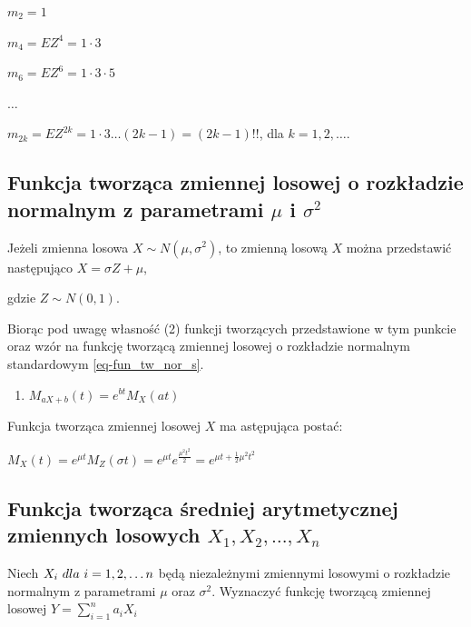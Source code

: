 \documentclass[
  letterpaper,
  DIV=11,
  numbers=noendperiod]{scrreprt}
\providecommand{\tightlist}{%
  \setlength{\itemsep}{0pt}\setlength{\parskip}{0pt}}\usepackage{longtable,booktabs,array}
\begin{document}
\(m_2 = 1\)

\(m_4 = EZ^4=1\cdot 3\)

\(m_6 = EZ^6=1\cdot 3 \cdot 5\)

\(\ldots\)

\(m_{2k} = EZ^{2k}=1\cdot 3 \ldots (2k-1)=(2k-1)!!\), dla
\(k = 1, 2, \ldots\).

\subsection{\texorpdfstring{Funkcja tworząca zmiennej losowej o
rozkładzie normalnym z parametrami \(\mu\) i
\(\sigma^2\)}{Funkcja tworząca zmiennej losowej o rozkładzie normalnym z parametrami \textbackslash mu i \textbackslash sigma\^{}2}}\label{funkcja-tworzux105ca-zmiennej-losowej-o-rozkux142adzie-normalnym-z-parametrami-mu-i-sigma2}

Jeżeli zmienna losowa \(X \sim N(\mu,\sigma^2)\), to zmienną losową
\(X\) można przedstawić następująco \(X = \sigma Z + \mu\),

gdzie \(Z \sim N(0,1)\).

Biorąc pod uwagę własność (2) funkcji tworzących przedstawione w tym
punkcie oraz wzór na funkcję tworzącą zmiennej losowej o rozkładzie
normalnym standardowym \ref{eq-fun_tw_nor_s}.

\begin{enumerate}
\def\labelenumi{\arabic{enumi}.}
\setcounter{enumi}{1}
\tightlist
\item
  \(M_{aX+b}(t)= e^{bt}M_X(at)\)
\end{enumerate}

Funkcja tworząca zmiennej losowej \(X\) ma astępująca postać:

\(M_X(t)=e^{\mu t} M_Z(\sigma t) = e^{\mu t} e^{\frac{\mu^2 t^2}{2}} = e^{\mu t +\frac{1}{2} \mu^2 t^2}\)

\subsection{\texorpdfstring{Funkcja tworząca średniej arytmetycznej
zmiennych losowych
\(X_1, X_2, \ldots, X_n\)}{Funkcja tworząca średniej arytmetycznej zmiennych losowych X\_1, X\_2, \textbackslash ldots, X\_n}}\label{funkcja-tworzux105ca-ux15bredniej-arytmetycznej-zmiennych-losowych-x_1-x_2-ldots-x_n}

Niech \(X_i {\text \ dla \ i = 1, 2,\ldots n}\) będą niezależnymi
zmiennymi losowymi o rozkładzie normalnym z parametrami \(\mu\) oraz
\(\sigma^2\). Wyznaczyć funkcję tworzącą zmiennej losowej
\(Y = \sum_{i=1}^n a_iX_i\)
\end{document}
